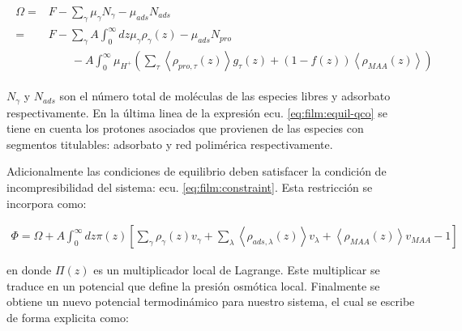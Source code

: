 \begin{align}
	\begin{aligned}
		\Omega = &F - \sum_\gamma \mu_\gamma N_\gamma -  \mu_{ads} N_{ads} \\
			= &F -\sum_\gamma A\int_0^\infty dz \mu_\gamma \rho_\gamma(z) -  \mu_{ads} N_{pro}  \\
			& \qquad -A\int_0^\infty \mu_{H^+} \left( \sum_\tau\left< \rho_{pro,\tau}(z) \right>g_\tau(z) + (1-f(z))\left< \rho_{MAA}(z) \right> \right )
			\end{aligned}
		\label{eq:film:equil-qco}
\end{align}

\noindent $N_\gamma$ y $ N_{ads}$ son el n\'umero total de mol\'eculas de las especies libres y adsorbato respectivamente. En la \'ultima linea de la expresi\'on ecu. \ref{eq:film:equil-qco} se tiene en cuenta los protones asociados que  provienen de las especies con segmentos titulables: adsorbato y red polim\'erica respectivamente.


Adicionalmente las condiciones de equilibrio deben satisfacer la condici\'on de incompresibilidad del sistema: ecu. \ref{eq:film:constraint}.  Esta restricci\'on se incorpora como:

\begin{align}
	\Phi = \Omega +A \int_0^\infty dz\pi(z){\left[\sum_{\gamma}\rho_\gamma(z) v_\gamma + \sum_\lambda{\left<\rho_{ads,\lambda}(z)\right>v_\lambda} + \left<\rho_{MAA}(z)\right>v_{MAA} -1 \right]}
\end{align}


\noindent en donde $\Pi(z)$ es un multiplicador local de Lagrange.  Este multiplicar se traduce en un potencial que define la presi\'on osm\'otica local. Finalmente se obtiene un nuevo potencial termodin\'amico para nuestro sistema, el cual se escribe de forma explicita como:
 
